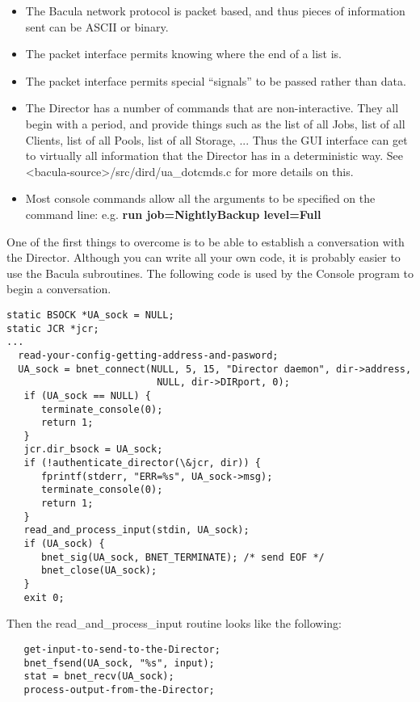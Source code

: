\begin{itemize}
\item The Bacula network protocol is packet based, and  thus pieces of
information sent can be ASCII or binary.
\item The packet interface permits knowing where the end of  a list is.
\item The packet interface permits special ``signals''  to be passed rather
than data.
\item The Director has a number of commands that are  non-interactive. They
all begin with a period,  and provide things such as the list of all Jobs,
list of all Clients, list of all Pools, list of  all Storage, ... Thus the GUI
interface can get  to virtually all information that the Director has  in a
deterministic way. See  {\textless}bacula-source{\textgreater}/src/dird/ua\_dotcmds.c for
more details on this.
\item Most console commands allow all the arguments to  be specified on the
command line: e.g.  {\bf run job=NightlyBackup level=Full}
\end{itemize}

One of the first things to overcome is to be able to establish a conversation
with the Director. Although you can write all your own code, it is probably
easier to use the Bacula subroutines. The following code is used by the
Console program to begin a conversation.

\footnotesize
\begin{verbatim}
static BSOCK *UA_sock = NULL;
static JCR *jcr;
...
  read-your-config-getting-address-and-pasword;
  UA_sock = bnet_connect(NULL, 5, 15, "Director daemon", dir->address,
                          NULL, dir->DIRport, 0);
   if (UA_sock == NULL) {
      terminate_console(0);
      return 1;
   }
   jcr.dir_bsock = UA_sock;
   if (!authenticate_director(\&jcr, dir)) {
      fprintf(stderr, "ERR=%s", UA_sock->msg);
      terminate_console(0);
      return 1;
   }
   read_and_process_input(stdin, UA_sock);
   if (UA_sock) {
      bnet_sig(UA_sock, BNET_TERMINATE); /* send EOF */
      bnet_close(UA_sock);
   }
   exit 0;
\end{verbatim}
\normalsize

Then the read\_and\_process\_input routine looks like the following:

\footnotesize
\begin{verbatim}
   get-input-to-send-to-the-Director;
   bnet_fsend(UA_sock, "%s", input);
   stat = bnet_recv(UA_sock);
   process-output-from-the-Director;
\end{verbatim}
\normalsize


